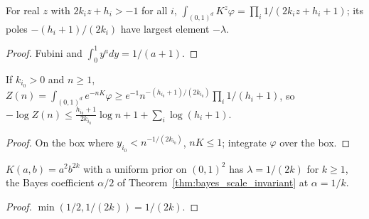 \begin{theorem}\label{thm:normal_crossing_zeta}
\leanok
{}
For real $z$ with $2k_iz+h_i>-1$ for all $i$,
$\int_{(0,1)^d}K^z\varphi=\prod_i1/(2k_iz+h_i+1)$; its poles $-(h_i+1)/(2k_i)$ have largest
element $-\lambda$.
\end{theorem}
\begin{proof}
\leanok
Fubini and $\int_0^1y^{a}dy=1/(a+1)$.
\end{proof}

\begin{theorem}\label{thm:normal_crossing_free_energy}
\leanok
{}
If $k_{i_0}>0$ and $n\ge1$, $Z(n)=\int_{(0,1)^d}e^{-nK}\varphi\ge
e^{-1}n^{-(h_{i_0}+1)/(2k_{i_0})}\prod_i1/(h_i+1)$, so
$-\log Z(n)\le\frac{h_{i_0}+1}{2k_{i_0}}\log n+1+\sum_i\log(h_i+1)$.
\end{theorem}
\begin{proof}
\leanok
On the box where $y_{i_0}<n^{-1/(2k_{i_0})}$, $nK\le1$; integrate $\varphi$ over the box.
\end{proof}

\begin{corollary}[The toy model $y=ab^kx$]\label{cor:toy_rlct}
\leanok
{}
$K(a,b)=a^2b^{2k}$ with a uniform prior on $(0,1)^2$ has $\lambda=1/(2k)$ for $k\ge1$, the Bayes
coefficient $\alpha/2$ of Theorem~\ref{thm:bayes_scale_invariant} at $\alpha=1/k$.
\end{corollary}
\begin{proof}
\leanok
$\min(1/2,1/(2k))=1/(2k)$.
\end{proof}

